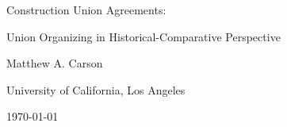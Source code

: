\renewenvironment{abstract}
  {\par\noindent\centering\textbf{Abstract}\par\noindent\raggedright}
  {\par}


\renewenvironment{quote}
  {\list{}{\leftmargin=\parindent\rightmargin=0pt}%
   \item\relax}
  {\endlist}
  





\begin{titlepage}
  \thispagestyle{fancy}
  \centering
  \vspace*{1.95in}
  {\LARGE Construction Union Agreements:\par Union Organizing in Historical-Comparative Perspective\par}
  \vspace{1.2in}
  {Matthew A. Carson\par}
  \vspace{0in}
  {University of California, Los Angeles\par}
  \vspace{0.5in}
  {\today\par}
\end{titlepage}


